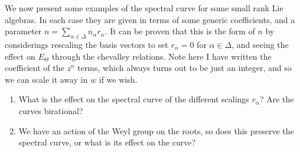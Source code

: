 \documentclass{article}
\begin{document}
We now present some examples of the spectral curve for some small rank Lie algebras. In each case they are given in terms of some generic coefficients, and a parameter $n = \sum_{\alpha \in \bar{\Delta}} n_\alpha r_\alpha$. It can be proven that this is the form of $n$ by considerings rescaling the basis vectors to set $r_\alpha=0$ for $\alpha \in \Delta$, and seeing the effect on $E_{\Theta}$ through the chevalley relations.  
Note here I have written the coefficient of the $z^n$ terms, which always turns out to be just an integer, and so we can scale it away in $w$ if we wish. 
\begin{enumerate}
	\item What is the effect on the spectral curve of the different scalings $r_\alpha$? Are the curves birational?
	\item We have an action of the Weyl group on the roots, so does this preserve the spectral curve, or what is its effect on the curve? 
\end{enumerate}

\end{document}

